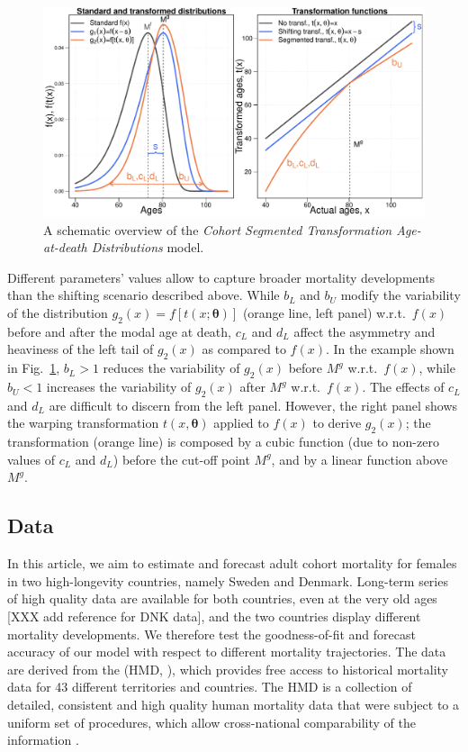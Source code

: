 \documentclass[11pt, a4paper]{article}
\begin{document}
\begin{figure}[t]
	\begin{center}
		\includegraphics[scale=0.57]{./Figures/F1.pdf} 
		\caption{A schematic overview of the \emph{Cohort Segmented Transformation Age-at-death Distributions} model.\label{Fig:CSTADmodel}}    
	\end{center}
\end{figure}

Different parameters' values allow to capture broader mortality developments than the shifting scenario described above. While $b_L$ and $b_U$ modify the variability of the distribution $g_2(x)=f\left[t(x;\bm{\theta})\right]$ (orange line, left panel) w.r.t.~$f(x)$ before and after the modal age at death, $c_L$ and $d_L$ affect the asymmetry and heaviness of the left tail of $g_2(x)$ as compared to $f(x)$. In the example shown in Fig.~\ref{Fig:CSTADmodel}, $b_L > 1$ reduces the variability of $g_2(x)$ before $M^g$ w.r.t.~$f(x)$, while $b_U < 1$ increases the variability of $g_2(x)$ after $M^g$ w.r.t.~$f(x)$. The effects of $c_L$ and $d_L$ are difficult to discern from the left panel. However, the right panel shows the warping transformation $t(x,\bm{\theta})$ applied to $f(x)$ to derive $g_2(x)$; the transformation (orange line) is composed by a cubic function (due to non-zero values of $c_L$ and $d_L$) before the cut-off point $M^g$, and by a linear function above $M^g$.

\subsection{Data}
\label{Subsec:Data}
In this article, we aim to estimate and forecast adult cohort mortality for females in two high-longevity countries, namely Sweden and Denmark. Long-term series of high quality data are available for both countries, even at the very old ages \citep{vaupel1994longer,wilmoth1996extreme}[XXX add reference for DNK data], and the two countries display different mortality developments. We therefore test the goodness-of-fit and forecast accuracy of our model with respect to different mortality trajectories. The data are derived from the \citeauthor{HMD} (HMD, \citeyear{HMD}), which provides free access to historical mortality data for 43 different territories and countries. The HMD is a collection of detailed, consistent and high quality human mortality data that were subject to a uniform set of procedures, which allow cross-national comparability of the information \citep{barbieri2015data}.
\end{document}
